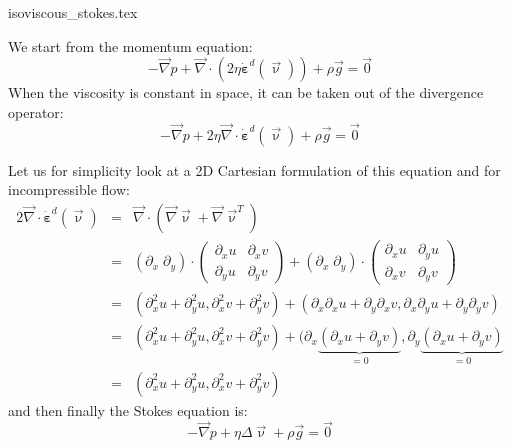 \begin{flushright} {\tiny {\color{gray} isoviscous\_stokes.tex}} \end{flushright}

We start from the momentum equation:
\begin{equation}
-{\vec \nabla}p + {\vec \nabla}\cdot (2 \eta \dot{\bm \varepsilon}^d(\vec\upnu) ) + \rho {\vec g} = \vec{0}
\end{equation}
When the viscosity is constant in space, it can be taken out of the divergence operator:
\begin{equation}
-{\vec \nabla}p + 2 \eta {\vec \nabla}\cdot \dot{\bm \varepsilon}^d(\vec\upnu)  + \rho {\vec g} = \vec{0}
\end{equation}

Let us for simplicity look at a 2D Cartesian formulation of this equation and for incompressible flow:
\begin{eqnarray}
2 {\vec \nabla}\cdot \dot{\bm \varepsilon}^d (\vec\upnu)
&=& \vec\nabla \cdot \left( \vec\nabla \vec\upnu + \vec\nabla \vec\upnu ^T \right) \\ 
&=& 
(\partial_x \; \partial_y) \cdot
\left(
\begin{array}{cc}
\partial_x u & \partial_x v \\
\partial_y u & \partial_y v 
\end{array}
\right) + 
(\partial_x \; \partial_y) \cdot
\left(
\begin{array}{cc}
\partial_x u & \partial_y u \\
\partial_x v & \partial_y v 
\end{array}
\right) \\
&=&( \partial_x^2 u + \partial_y^2 u , \partial_x^2 v + \partial_y^2 v )
+(\partial_x \partial_x u + \partial_y \partial_x v , 
 \partial_x \partial_y u + \partial_y \partial_y v)  \\
&=&( \partial_x^2 u + \partial_y^2 u , \partial_x^2 v + \partial_y^2 v )
+(\partial_x \underbrace{(\partial_x u + \partial_y v)}_{=0} , 
  \partial_y \underbrace{(\partial_x u + \partial_y v)}_{=0}  \\
&=&( \partial_x^2 u + \partial_y^2 u , \partial_x^2 v + \partial_y^2 v )
\end{eqnarray}
and then finally the Stokes equation is:
\begin{equation}
-\vec\nabla p  + \eta \Delta \vec \upnu + \rho \vec g = \vec{0}
\end{equation}

